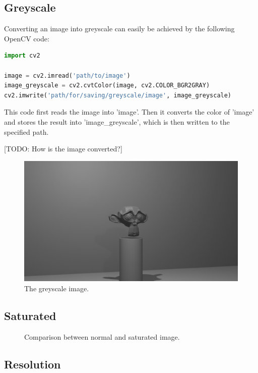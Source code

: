\subsection{Greyscale}
Converting an image into greyscale can easily be achieved by the following OpenCV code:

\begin{lstlisting}[language=python]
import cv2

image = cv2.imread('path/to/image')
image_greyscale = cv2.cvtColor(image, cv2.COLOR_BGR2GRAY)
cv2.imwrite('path/for/saving/greyscale/image', image_greyscale)
\end{lstlisting}

This code first reads the image into 'image'. Then it converts the color of 'image' and stores the result into 'image\_greyscale', which is then written to the specified path.

[TODO: How is the image converted?]

\begin{figure}[h!]
	\centering
	\includegraphics[width=5in]{img/implementation_opencv_greyscale.png}
	\caption{The greyscale image.}
	\label{pic:implementation_opencv_greyscale}
\end{figure}

\subsection{Saturated}

\begin{figure}[h!]
	\centering
	\caption{Comparison between normal and saturated image.}
	\label{pic:implementation_opencv_saturated}
\end{figure}

\subsection{Resolution}

